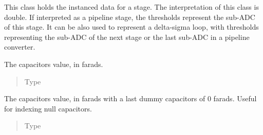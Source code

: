 \documentclass[letterpaper,10pt,english]{sphinxmanual}
\begin{document}
\begin{fulllineitems}
\label{\detokenize{gen:calib.gen.StageParameters}}
This class holds the instanced data for a stage. The interpretation of this
class is double. If interpreted as a pipeline stage, the thresholds
represent the sub-ADC of this stage. It can be also used to represent a
delta-sigma loop, with thresholds representing the sub-ADC of the next
stage or the last sub-ADC in a pipeline converter.

\begin{fulllineitems}
\label{\detokenize{gen:calib.gen.StageParameters.caps}}
The capacitors value, in farads.
\begin{quote}\begin{description}
\item[{Type}] \leavevmode
{}

\end{description}\end{quote}

\end{fulllineitems}


\begin{fulllineitems}
\label{\detokenize{gen:calib.gen.StageParameters.caps_ext}}
The capacitors value, in farads with a last dummy capacitors of 0
farads. Useful for indexing null capacitors.
\begin{quote}\begin{description}
\item[{Type}] \leavevmode
{}

\end{description}\end{quote}

\end{fulllineitems}


\end{fulllineitems}
\end{document}
